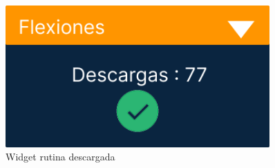 \begin{figure}[H]
   \centering
   \begin{minipage}{0.45\textwidth}
      \centering
      \includegraphics[width=0.9\textwidth]{fotos/Frame 58.png}
      \caption{Widget rutina descargada}
      \label{fig:Widget rutina descargada}
   \end{minipage}%
   \hspace{0.5cm}
   \begin{minipage}{0.45\textwidth}
      \centering

\end{minipage}
\end{figure}
